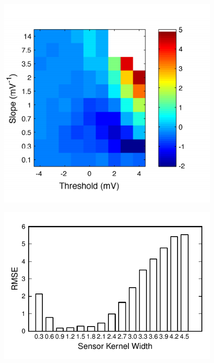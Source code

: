 \documentclass[5p,authoryear]{elsarticle}
\begin{document}
\clearpage
\newpage
\begin{figure}[!ht]
\begin{center}
\includegraphics{./Graph/pdf/fig11.pdf}
\end{center}
\caption{}
\label{fig:Figure11}
\end{figure}
\clearpage
\newpage
\begin{figure}[!ht]
\begin{center}
\includegraphics{./Graph/pdf/fig12.pdf}
\end{center}
\caption{}
\label{fig:Figure12}
\end{figure}
\end{document}
